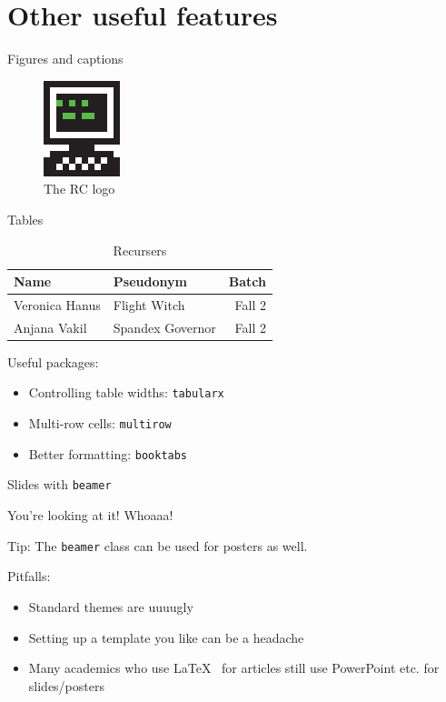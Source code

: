 \documentclass[xcolor={dvipsnames}]{beamer}
\begin{document}
\section{Other useful features}
\begin{frame}{Figures and captions}

\begin{figure}
\includegraphics[scale=1.5]{rc-logo}
\caption{The RC logo}
\end{figure}
\end{frame}

\begin{frame}{Tables}

\begin{table}
	\caption{Recursers}
	\begin{tabular}{llr}
		\toprule
		Name 					& Pseudonym 				& Batch	\\
		\midrule
		Veronica Hanus 	& Flight Witch 				& Fall 2	\\
		Anjana Vakil 		& Spandex Governor 	& Fall 2	\\
		\bottomrule
	\end{tabular}
\end{table}

\begin{block}{Useful packages:}
\begin{itemize}
\item Controlling table widths: \texttt{tabularx}
\item Multi-row cells: \texttt{multirow}
\item Better formatting: \texttt{booktabs} 
\end{itemize}
\end{block}

\end{frame}

\begin{frame}{Slides with \texttt{beamer}}

 You're looking at it! Whoaaa!

\pause

\vfill

\begin{block}{Tip:}
The \texttt{beamer} class can be used for posters as well.
\end{block}

\pause

\vfill

Pitfalls:
\begin{itemize}[<+->]
\item Standard themes are uuuugly
\item Setting up a template you like can be a headache
\item Many academics who use \LaTeX~ for articles still use PowerPoint etc. for slides/posters
\end{itemize}
\end{frame}
\end{document}
